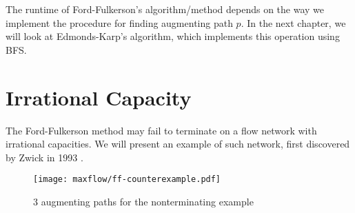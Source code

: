 The runtime of Ford-Fulkerson's algorithm/method depends on the way we implement the procedure for finding augmenting path $p$. In the next chapter, we will look at Edmonds-Karp's algorithm, which implements this operation using BFS.

\section{Irrational Capacity}

The Ford-Fulkerson method may fail to terminate on a flow network with irrational capacities. We will present an example of such network, first discovered by Zwick in 1993 \cite{Zwick-FF-Example}.

\begin{figure}[htbp]
    \centering
    \texttt{[image: maxflow/ff-counterexample.pdf]}
    \caption{3 augmenting paths for the nonterminating example}
    \label{fig:ff-counterexample-augment-path}
\end{figure}